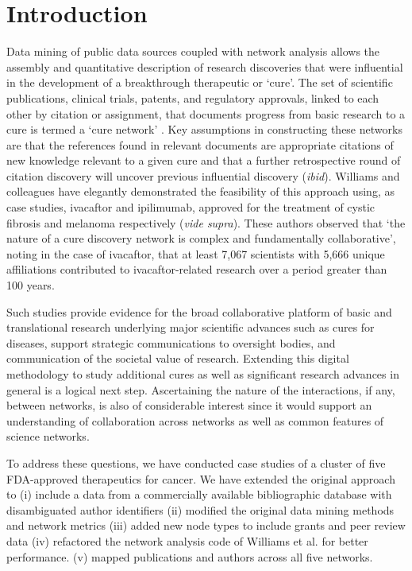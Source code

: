 \documentclass[10pt,letterpaper]{article}
\begin{document}
\linenumbers
\section*{Introduction}

Data mining of public data sources coupled with network analysis allows the assembly and quantitative description of research discoveries that were influential in the development of a breakthrough therapeutic or `cure'.  The set of scientific publications, clinical trials, patents, and regulatory approvals, linked to each other by citation or assignment, that documents progress from basic research to a cure is termed a `cure network' \cite {bib1}. Key assumptions in constructing these networks are that the references found in relevant documents are appropriate citations of new knowledge relevant to a given cure and that a further retrospective round of citation discovery will uncover previous influential discovery (\textit{ibid}). Williams and colleagues have elegantly demonstrated the feasibility of this approach using, as case studies, ivacaftor and ipilimumab, approved for the treatment of cystic fibrosis and melanoma respectively (\textit{vide supra}). These authors observed that `the nature of a cure discovery network is complex and fundamentally collaborative', noting in the case of ivacaftor, that at least 7,067 scientists with 5,666 unique affiliations contributed to ivacaftor-related research over a period greater than 100 years. 

Such studies provide evidence for the broad collaborative platform of basic and translational research underlying major scientific advances such as cures for diseases, support strategic communications to oversight bodies, and communication of the societal value of research\cite {bib2,bib3}. Extending this digital methodology to study additional cures as well as significant research advances in general is a logical next step. Ascertaining the nature of the interactions, if any, between networks, is also of considerable interest since it would support an understanding of collaboration across networks as well as common features of science networks.  

To address these questions, we have conducted case studies of a cluster of five FDA-approved therapeutics for cancer. We have extended the original approach to (i) include a data from a commercially available bibliographic database with disambiguated author identifiers (ii) modified the original data mining methods and network metrics (iii) added new node types to include grants and peer review data (iv) refactored the network analysis code of Williams et al. for better performance. (v) mapped publications and authors across all five networks. 
\end{document}
